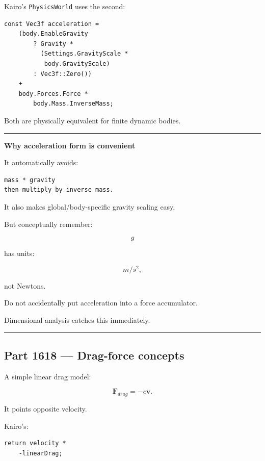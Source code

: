 Kairo's \texttt{PhysicsWorld} uses the second:

\begin{verbatim}
const Vec3f acceleration =
    (body.EnableGravity
        ? Gravity *
          (Settings.GravityScale *
           body.GravityScale)
        : Vec3f::Zero())
    +
    body.Forces.Force *
        body.Mass.InverseMass;
\end{verbatim}

Both are physically equivalent for finite dynamic bodies.

\begin{center}\rule{0.5\linewidth}{0.5pt}\end{center}

\textbf{Why acceleration form is convenient}

It automatically avoids:

\begin{verbatim}
mass * gravity
then multiply by inverse mass.
\end{verbatim}

It also makes global/body-specific gravity scaling easy.

But conceptually remember:

\[
g
\]

has units:

\[
m/s^2,
\]

not Newtons.

Do not accidentally put acceleration into a force accumulator.

Dimensional analysis catches this immediately.

\begin{center}\rule{0.5\linewidth}{0.5pt}\end{center}

\subsection{Part 1618 --- Drag-force concepts}\label{06-engine-ii-ch034-part-1618-drag-force-concepts}

A simple linear drag model:

\[
\boxed{
\mathbf{F}_{drag}
=
-c\mathbf{v}.
}
\]

It points opposite velocity.

Kairo's:

\begin{verbatim}
return velocity *
    -linearDrag;
\end{verbatim}

